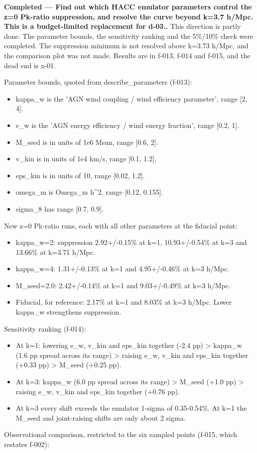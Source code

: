 \documentclass[11pt,a4paper]{article}
\begin{document}
\textbf{Completed --- Find out which HACC emulator parameters control the z=0 Pk-ratio suppression, and resolve the curve beyond k=3.7 h/Mpc. This is a budget-limited replacement for d-03..} This direction is partly done. The parameter bounds, the sensitivity ranking and the 5\%/10\% check were completed. The suppression minimum is not resolved above k=3.73 h/Mpc, and the comparison plot was not made. Results are in f-013, f-014 and f-015, and the dead end is x-01.

Parameter bounds, quoted from describe\_parameters (f-013):

\begin{itemize}
  \item kappa\_w is the 'AGN wind coupling / wind efficiency parameter', range [2, 4].
  \item e\_w is the 'AGN energy efficiency / wind energy fraction', range [0.2, 1].
  \item M\_seed is in units of 1e6 Msun, range [0.6, 2].
  \item v\_kin is in units of 1e4 km/s, range [0.1, 1.2].
  \item eps\_kin is in units of 10, range [0.02, 1.2].
  \item omega\_m is Omega\_m h\textasciicircum{}2, range [0.12, 0.155].
  \item sigma\_8 has range [0.7, 0.9].
\end{itemize}
New z=0 Pk-ratio runs, each with all other parameters at the fiducial point:

\begin{itemize}
  \item kappa\_w=2: suppression 2.92+/-0.15\% at k=1, 10.93+/-0.54\% at k=3 and 13.66\% at k=3.71 h/Mpc.
  \item kappa\_w=4: 1.31+/-0.13\% at k=1 and 4.95+/-0.46\% at k=3 h/Mpc.
  \item M\_seed=2.0: 2.42+/-0.14\% at k=1 and 9.03+/-0.49\% at k=3 h/Mpc.
  \item Fiducial, for reference: 2.17\% at k=1 and 8.03\% at k=3 h/Mpc.
Lower kappa\_w strengthens suppression.

\end{itemize}
Sensitivity ranking (f-014):

\begin{itemize}
  \item At k=1: lowering e\_w, v\_kin and eps\_kin together (-2.4 pp) \textgreater{} kappa\_w (1.6 pp spread across its range) \textgreater{} raising e\_w, v\_kin and eps\_kin together (+0.33 pp) \textgreater{} M\_seed (+0.25 pp).
  \item At k=3: kappa\_w (6.0 pp spread across its range) \textgreater{} M\_seed (+1.0 pp) \textgreater{} raising e\_w, v\_kin and eps\_kin together (+0.76 pp).
  \item At k=3 every shift exceeds the emulator 1-sigma of 0.35-0.54\%. At k=1 the M\_seed and joint-raising shifts are only about 2 sigma.
\end{itemize}
Observational comparison, restricted to the six sampled points (f-015, which restates f-002):
\end{document}
